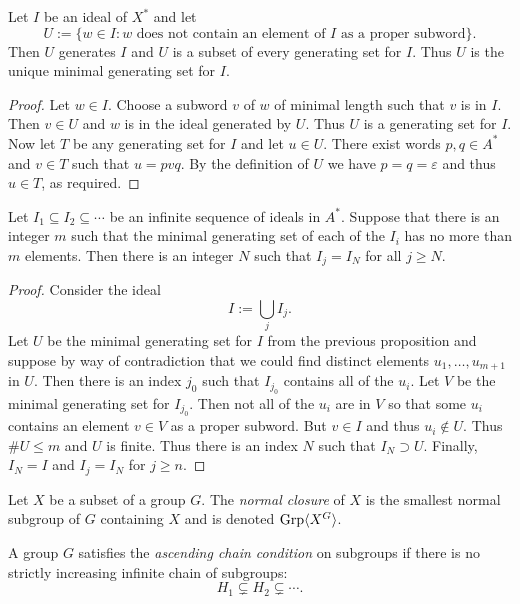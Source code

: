 \begin{prop} \label{mingenset} Let $I$ be an ideal of $X^*$ and let \emph{\[U
    := \{ w \in I : w \text{ does not contain an element of } I \text{ as a
    proper subword}\}.\]} Then $U$ generates $I$ and $U$ is a subset of every
    generating set for $I$. Thus $U$ is the unique minimal generating set for
    $I$.
\end{prop}
\begin{proof} Let $w\in I$. Choose a subword $v$ of $w$ of minimal length such
    that $v$ is in $I$. Then $v\in U$ and $w$ is in the ideal generated by $U$.
    Thus $U$ is a generating set for $I$. Now let $T$ be any generating set for
    $I$ and let $u\in U$. There exist words $p,q \in A^*$ and $v\in T$ such
    that $u = pvq$. By the definition of $U$ we have $p=q=\varepsilon$ and thus
    $u\in T$, as required.
\end{proof}

\begin{prop} Let $I_1 \subseteq I_2 \subseteq \cdots$ be an infinite sequence
    of ideals in $A^*$. Suppose that there is an integer $m$ such that the
    minimal generating set of each of the $I_i$ has no more than $m$ elements.
    Then there is an integer $N$ such that $I_j=I_N$ for all $j \ge N.$
\end{prop}
\begin{proof} Consider the ideal \[I := \bigcup_j I_j.\] Let $U$ be the minimal
    generating set for $I$ from the previous proposition and suppose by way of
    contradiction that we could find distinct elements $u_1,\dots,u_{m+1}$ in
    $U$. Then there is an index $j_0$ such that $I_{j_0}$ contains all of the
    $u_i$. Let $V$ be the minimal generating set for $I_{j_0}$. Then not all of
    the $u_i$ are in $V$ so that some $u_i$ contains an element $v\in V$ as a
    proper subword. But $v\in I$ and thus $u_i \notin U$. Thus $\#U \le m$ and
    $U$ is finite. Thus there is an index $N$ such that $I_N \supset U$.
    Finally, $I_N = I$ and $I_j = I_N$ for $j\ge n$.
\end{proof}

\begin{defn} Let $X$ be a subset of a group $G$. The \emph{normal closure} of
    $X$ is the smallest normal subgroup of $G$ containing $X$ and is denoted
    $\mathrm{Grp}\langle X^G\rangle$.
\end{defn}

\begin{defn} A group $G$ satisfies the \emph{ascending chain condition} on
    subgroups if there is no strictly increasing infinite chain of subgroups:
    \[H_1 \subsetneq H_2 \subsetneq \cdots.\]
\end{defn}

